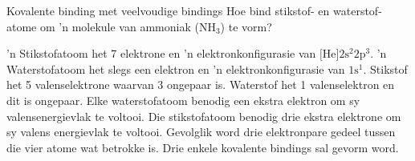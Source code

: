 \begin{wex}{Kovalente binding met veelvoudige bindings }{
Hoe bind stikstof- en waterstof- atome om 'n molekule van ammoniak ($\text{NH}{}_{3}$) te vorm? 
}
{
 'n Stikstofatoom  het 7 elektrone en 'n elektronkonfigurasie van $\text{[He]}2\text{s}^{2}2\text{p}^{3}$. 'n Waterstofatoom het slegs een elektron en  'n elektronkonfigurasie van $1\text{s}^{1}$.
Stikstof het 5 valenselektrone waarvan 3 ongepaar is. Waterstof het 1 valenselektron en dit is ongepaar.
Elke waterstofatoom benodig een ekstra elektron om sy valensenergievlak te voltooi. Die stikstofatoom benodig drie ekstra elektrone om sy valens energievlak te voltooi. Gevolglik word drie elektronpare gedeel tussen die vier atome wat betrokke is. Drie enkele kovalente bindings sal gevorm word. 
\begin{figure}[H]
\begin{center}
\end{center}
 \end{figure}
 
}
\end{wex}
